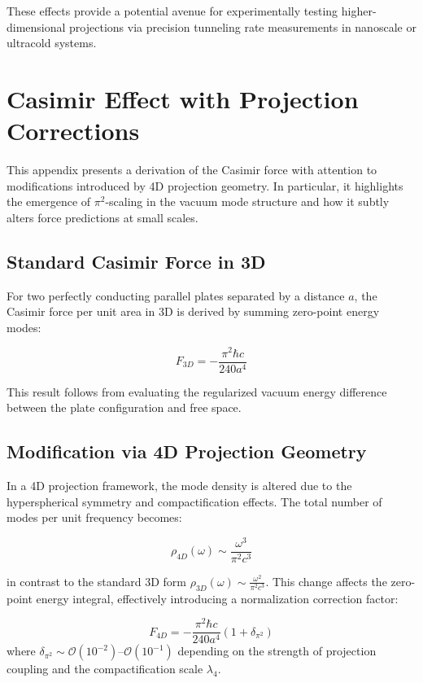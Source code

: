 \documentclass[12pt,a4paper]{article}
\begin{document}
These effects provide a potential avenue for experimentally testing higher-dimensional projections via precision tunneling rate measurements in nanoscale or ultracold systems.

\section{Casimir Effect with Projection Corrections}
\label{app:casimir}

This appendix presents a derivation of the Casimir force with attention to modifications introduced by 4D projection geometry. In particular, it highlights the emergence of \(\pi^2\)-scaling in the vacuum mode structure and how it subtly alters force predictions at small scales.

\subsection{Standard Casimir Force in 3D}

For two perfectly conducting parallel plates separated by a distance \(a\), the Casimir force per unit area in 3D is derived by summing zero-point energy modes:

\begin{equation}
F_{3D} = -\frac{\pi^2 \hbar c}{240 a^4}
\end{equation}

This result follows from evaluating the regularized vacuum energy difference between the plate configuration and free space.

\subsection{Modification via 4D Projection Geometry}

In a 4D projection framework, the mode density is altered due to the hyperspherical symmetry and compactification effects. The total number of modes per unit frequency becomes:

\begin{equation}
\rho_{4D}(\omega) \sim \frac{\omega^3}{\pi^2 c^3}
\end{equation}

in contrast to the standard 3D form \(\rho_{3D}(\omega) \sim \frac{\omega^2}{\pi^2 c^3}\). This change affects the zero-point energy integral, effectively introducing a normalization correction factor:

\begin{equation}
F_{4D} = -\frac{\pi^2 \hbar c}{240 a^4} \left( 1 + \delta_{\pi^2} \right)
\end{equation}
where \(\delta_{\pi^2} \sim \mathcal{O}(10^{-2})\)–\(\mathcal{O}(10^{-1})\) depending on the strength of projection coupling and the compactification scale \(\lambda_4\).
\end{document}

